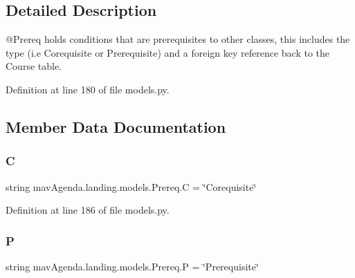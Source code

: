 \subsection{Detailed Description}
\begin{DoxyVerb}@Prereq  holds conditions that are prerequisites to other classes,
        this includes the type (i.e Corequisite or Prerequisite) and a foreign key reference
        back to the Course table.
\end{DoxyVerb}
 

Definition at line 180 of file models.\+py.



\subsection{Member Data Documentation}
\mbox{\label{classmavAgenda_1_1landing_1_1models_1_1Prereq_addf5211dcaf1971dd0cca476d7ed9e14}} 
\subsubsection{\texorpdfstring{C}{C}}
{\footnotesize\ttfamily string mav\+Agenda.\+landing.\+models.\+Prereq.\+C = \char`\"{}Corequisite\char`\"{}\hspace{0.3cm}{\ttfamily [static]}}



Definition at line 186 of file models.\+py.

\mbox{\label{classmavAgenda_1_1landing_1_1models_1_1Prereq_af35ddd9df5e0a2abaa462d090fd507b5}} 
\subsubsection{\texorpdfstring{P}{P}}
{\footnotesize\ttfamily string mav\+Agenda.\+landing.\+models.\+Prereq.\+P = \char`\"{}Prerequisite\char`\"{}\hspace{0.3cm}{\ttfamily [static]}}



